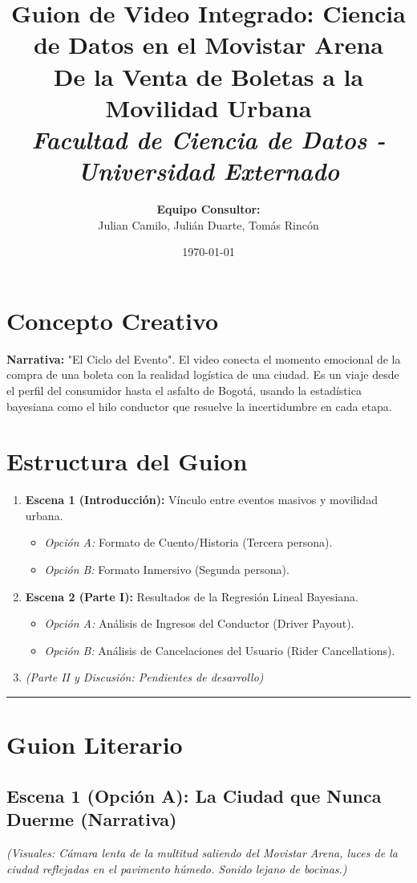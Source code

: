 \documentclass[11pt,a4paper]{article}
\title{
    \textbf{\huge Guion de Video Integrado: Ciencia de Datos en el Movistar Arena} \\
    \large De la Venta de Boletas a la Movilidad Urbana \\
    \vspace{0.5cm}
    \textit{Facultad de Ciencia de Datos - Universidad Externado}
}
\author{
    \textbf{Equipo Consultor:} \\
    Julian Camilo, Julián Duarte, Tomás Rincón
}
\date{\today}
\begin{document}
\maketitle

\section{Concepto Creativo}
\textbf{Narrativa:} "El Ciclo del Evento". El video conecta el momento emocional de la compra de una boleta con la realidad logística de una ciudad. Es un viaje desde el perfil del consumidor hasta el asfalto de Bogotá, usando la estadística bayesiana como el hilo conductor que resuelve la incertidumbre en cada etapa.

\section{Estructura del Guion}
\begin{enumerate}
    \item \textbf{Escena 1 (Introducción):} Vínculo entre eventos masivos y movilidad urbana.
    \begin{itemize}
        \item \textit{Opción A:} Formato de Cuento/Historia (Tercera persona).
        \item \textit{Opción B:} Formato Inmersivo (Segunda persona).
    \end{itemize}
    \item \textbf{Escena 2 (Parte I):} Resultados de la Regresión Lineal Bayesiana.
    \begin{itemize}
        \item \textit{Opción A:} Análisis de Ingresos del Conductor (Driver Payout).
        \item \textit{Opción B:} Análisis de Cancelaciones del Usuario (Rider Cancellations).
    \end{itemize}
    \item \textit{(Parte II y Discusión: Pendientes de desarrollo)}
\end{enumerate}

\hrule
\vspace{0.5cm}

\section{Guion Literario}

\subsection{Escena 1 (Opción A): La Ciudad que Nunca Duerme (Narrativa)}
\textit{(Visuales: Cámara lenta de la multitud saliendo del Movistar Arena, luces de la ciudad reflejadas en el pavimento húmedo. Sonido lejano de bocinas.)}
\end{document}
